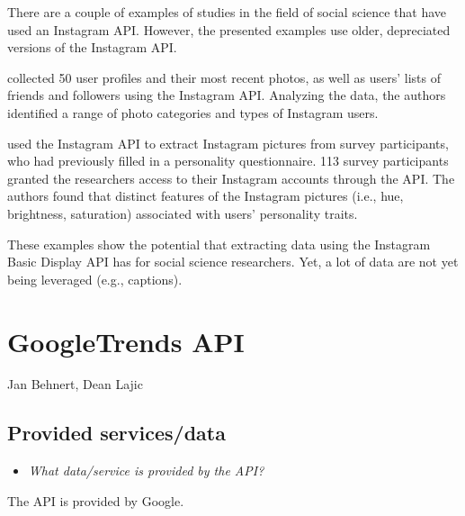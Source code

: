 \documentclass[
]{book}
\providecommand{\tightlist}{%
  \setlength{\itemsep}{0pt}\setlength{\parskip}{0pt}}
\begin{document}
There are a couple of examples of studies in the field of social science that have used an Instagram API. However, the presented examples use older, depreciated versions of the Instagram API.

\citet{Hu2014-br} collected 50 user profiles and their most recent photos, as well as users' lists of friends and followers using the Instagram API. Analyzing the data, the authors identified a range of photo categories and types of Instagram users.

\citet{Ferwerda2015-db} used the Instagram API to extract Instagram pictures from survey participants, who had previously filled in a personality questionnaire. 113 survey participants granted the researchers access to their Instagram accounts through the API. The authors found that distinct features of the Instagram pictures (i.e., hue, brightness, saturation) associated with users' personality traits.

These examples show the potential that extracting data using the Instagram Basic Display API has for social science researchers. Yet, a lot of data are not yet being leveraged (e.g., captions).

\hypertarget{googletrends-api}{%
\chapter{GoogleTrends API}\label{googletrends-api}}

Jan Behnert, Dean Lajic

\hypertarget{provided-servicesdata-7}{%
\section{Provided services/data}\label{provided-servicesdata-7}}

\begin{itemize}
\tightlist
\item
  \emph{What data/service is provided by the API?}
\end{itemize}

The API is provided by Google.
\end{document}
